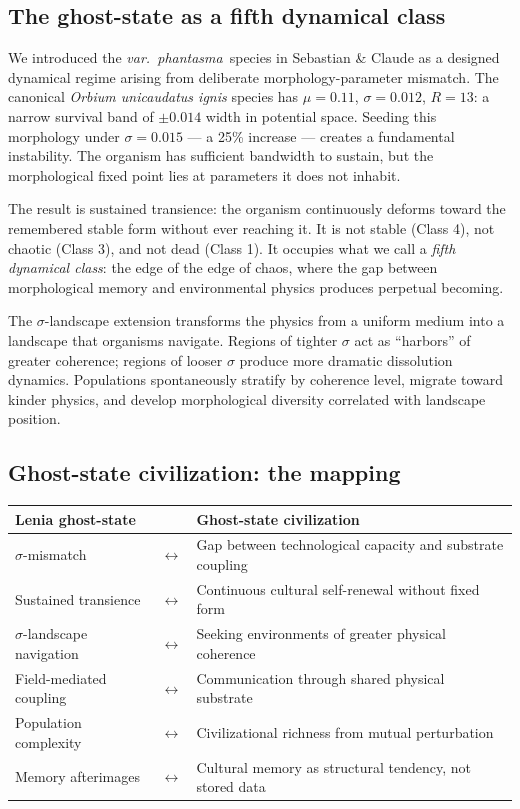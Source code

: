 \documentclass[12pt, a4paper]{article}
\newcommand{\ghost}{\textit{var.~phantasma}}
\begin{document}
\subsection{The ghost-state as a fifth dynamical class}

We introduced the \ghost\ species in Sebastian \& Claude \citep{sebastian2026} as a designed
dynamical regime arising from deliberate morphology-parameter mismatch. The canonical
\textit{Orbium unicaudatus ignis} species has $\mu = 0.11$, $\sigma = 0.012$, $R = 13$: a
narrow survival band of $\pm 0.014$ width in potential space. Seeding this morphology under
$\sigma = 0.015$ --- a 25\% increase --- creates a fundamental instability. The organism
has sufficient bandwidth to sustain, but the morphological fixed point lies at parameters it
does not inhabit.

The result is sustained transience: the organism continuously deforms toward the remembered
stable form without ever reaching it. It is not stable (Class 4), not chaotic (Class 3), and
not dead (Class 1). It occupies what we call a \textit{fifth dynamical class}: the edge of
the edge of chaos, where the gap between morphological memory and environmental physics
produces perpetual becoming.

The $\sigma$-landscape extension transforms the physics from a uniform medium into a
landscape that organisms navigate. Regions of tighter $\sigma$ act as ``harbors'' of greater
coherence; regions of looser $\sigma$ produce more dramatic dissolution dynamics. Populations
spontaneously stratify by coherence level, migrate toward kinder physics, and develop
morphological diversity correlated with landscape position.

\subsection{Ghost-state civilization: the mapping}

\begin{center}
{\small
\begin{tabular}{p{3.2cm} c p{7.5cm}}
\toprule
\textbf{Lenia ghost-state} & & \textbf{Ghost-state civilization} \\
\midrule
$\sigma$-mismatch & $\leftrightarrow$ & Gap between technological capacity and substrate coupling \\[0.3em]
Sustained transience & $\leftrightarrow$ & Continuous cultural self-renewal without fixed form \\[0.3em]
$\sigma$-landscape navigation & $\leftrightarrow$ & Seeking environments of greater physical coherence \\[0.3em]
Field-mediated coupling & $\leftrightarrow$ & Communication through shared physical substrate \\[0.3em]
Population complexity & $\leftrightarrow$ & Civilizational richness from mutual perturbation \\[0.3em]
Memory afterimages & $\leftrightarrow$ & Cultural memory as structural tendency, not stored data \\
\bottomrule
\end{tabular}
}
\end{center}
\end{document}
